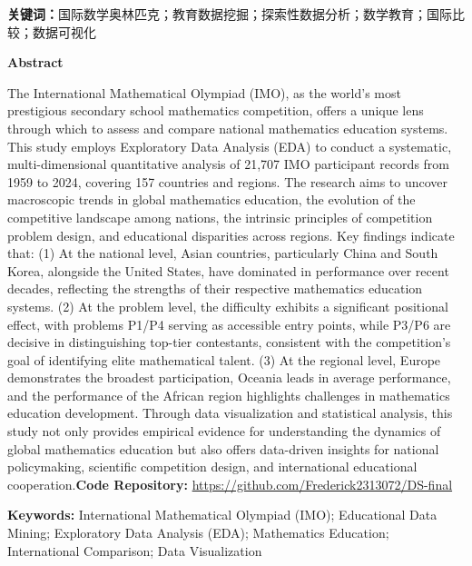 \documentclass[12pt,a4paper]{article}
\begin{document}
\vspace{1em}
\noindent\textbf{关键词：}国际数学奥林匹克；教育数据挖掘；探索性数据分析；数学教育；国际比较；数据可视化

\vspace{0.5em}

\clearpage
{}
{}
\begin{center}
    {\bfseries Abstract}
\end{center}
\vspace{0.5em}
\small

The International Mathematical Olympiad (IMO), as the world's most prestigious secondary school mathematics competition, offers a unique lens through which to assess and compare national mathematics education systems. This study employs Exploratory Data Analysis (EDA) to conduct a systematic, multi-dimensional quantitative analysis of 21,707 IMO participant records from 1959 to 2024, covering 157 countries and regions. The research aims to uncover macroscopic trends in global mathematics education, the evolution of the competitive landscape among nations, the intrinsic principles of competition problem design, and educational disparities across regions. Key findings indicate that: (1) At the national level, Asian countries, particularly China and South Korea, alongside the United States, have dominated in performance over recent decades, reflecting the strengths of their respective mathematics education systems. (2) At the problem level, the difficulty exhibits a significant positional effect, with problems P1/P4 serving as accessible entry points, while P3/P6 are decisive in distinguishing top-tier contestants, consistent with the competition's goal of identifying elite mathematical talent. (3) At the regional level, Europe demonstrates the broadest participation, Oceania leads in average performance, and the performance of the African region highlights challenges in mathematics education development. Through data visualization and statistical analysis, this study not only provides empirical evidence for understanding the dynamics of global mathematics education but also offers data-driven insights for national policymaking, scientific competition design, and international educational cooperation.\textbf{Code Repository:} \url{https://github.com/Frederick2313072/DS-final}

\vspace{1em}
\noindent\textbf{Keywords:} International Mathematical Olympiad (IMO); Educational Data Mining; Exploratory Data Analysis (EDA); Mathematics Education; International Comparison; Data Visualization
\end{document}
